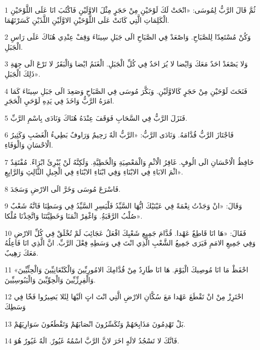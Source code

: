 \par 1 ثُمَّ قَالَ الرَّبُّ لِمُوسَى: «انْحَتْ لَكَ لَوْحَيْنِ مِنْ حَجَرٍ مِثْلَ الاوَّلَيْنِ فَاكْتُبَ انَا عَلَى اللَّوْحَيْنِ الْكَلِمَاتِ الَّتِي كَانَتْ عَلَى اللَّوْحَيْنِ الاوَّلَيْنِ اللَّذَيْنِ كَسَرْتَهُمَا.
\par 2 وَكُنْ مُسْتَعِدّا لِلصَّبَاحِ. وَاصْعَدْ فِي الصَّبَاحِ الَى جَبَلِ سِينَاءَ وَقِفْ عِنْدِي هُنَاكَ عَلَى رَاسِ الْجَبَلِ.
\par 3 وَلا يَصْعَدْ احَدٌ مَعَكَ وَايْضا لا يُرَ احَدٌ فِي كُلِّ الْجَبَلِ. الْغَنَمُ ايْضا وَالْبَقَرُ لا تَرْعَ الَى جِهَةِ ذَلِكَ الْجَبَلِ».
\par 4 فَنَحَتَ لَوْحَيْنِ مِنْ حَجَرٍ كَالاوَّلَيْنِ. وَبَكَّرَ مُوسَى فِي الصَّبَاحِ وَصَعِدَ الَى جَبَلِ سِينَاءَ كَمَا امَرَهُ الرَّبُّ وَاخَذَ فِي يَدِهِ لَوْحَيِ الْحَجَرِ.
\par 5 فَنَزَلَ الرَّبُّ فِي السَّحَابِ فَوَقَفَ عِنْدَهُ هُنَاكَ وَنَادَى بِاسْمِ الرَّبِّ.
\par 6 فَاجْتَازَ الرَّبُّ قُدَّامَهُ. وَنَادَى الرَّبُّ: «الرَّبُّ الَهٌ رَحِيمٌ وَرَاوفٌ بَطِيءُ الْغَضَبِ وَكَثِيرُ الْاحْسَانِ وَالْوَفَاءِ.
\par 7 حَافِظُ الْاحْسَانِ الَى الُوفٍ. غَافِرُ الْاثْمِ وَالْمَعْصِيَةِ وَالْخَطِيَّةِ. وَلَكِنَّهُ لَنْ يُبْرِئَ ابْرَاءً. مُفْتَقِدٌ اثْمَ الابَاءِ فِي الابْنَاءِ وَفِي ابْنَاءِ الابْنَاءِ فِي الْجِيلِ الثَّالِثِ وَالرَّابِعِ».
\par 8 فَاسْرَعَ مُوسَى وَخَرَّ الَى الارْضِ وَسَجَدَ.
\par 9 وَقَالَ: «انْ وَجَدْتُ نِعْمَةً فِي عَيْنَيْكَ ايُّهَا السَّيِّدُ فَلْيَسِرِ السَّيِّدُ فِي وَسَطِنَا فَانَّهُ شَعْبٌ صُلْبُ الرَّقَبَةُِ. وَاغْفِرْ اثْمَنَا وَخَطِيَّتَنَا وَاتَّخِذْنَا مُلْكا».
\par 10 فَقَالَ: «هَا انَا قَاطِعٌ عَهْدا. قُدَّامَ جَمِيعِ شَعْبِكَ افْعَلُ عَجَائِبَ لَمْ تُخْلَقْ فِي كُلِّ الارْضِ وَفِي جَمِيعِ الامَمِ فَيَرَى جَمِيعُ الشَّعْبِ الَّذِي انْتَ فِي وَسَطِهِ فِعْلَ الرَّبِّ. انَّ الَّذِي انَا فَاعِلُهُ مَعَكَ رَهِيبٌ.
\par 11 «احْفَظْ مَا انَا مُوصِيكَ الْيَوْمَ. هَا انَا طَارِدٌ مِنْ قُدَّامِكَ الامُورِيِّينَ وَالْكَنْعَانِيِّينَ وَالْحِثِّيِّينَ وَالْفِرِزِّيِّينَ وَالْحِوِّيِّينَ وَالْيَبُوسِيِّينَ.
\par 12 احْتَرِزْ مِنْ انْ تَقْطَعَ عَهْدا مَعَ سُكَّانِ الارْضِ الَّتِي انْتَ اتٍ الَيْهَا لِئَلا يَصِيرُوا فَخّا فِي وَسَطِكَ
\par 13 بَلْ تَهْدِمُونَ مَذَابِحَهُمْ وَتُكَسِّرُونَ انْصَابَهُمْ وَتَقْطَعُونَ سَوَارِيَهُمْ.
\par 14 فَانَّكَ لا تَسْجُدُ لالَهٍ اخَرَ لانَّ الرَّبَّ اسْمُهُ غَيُورٌ. الَهٌ غَيُورٌ هُوَ.
